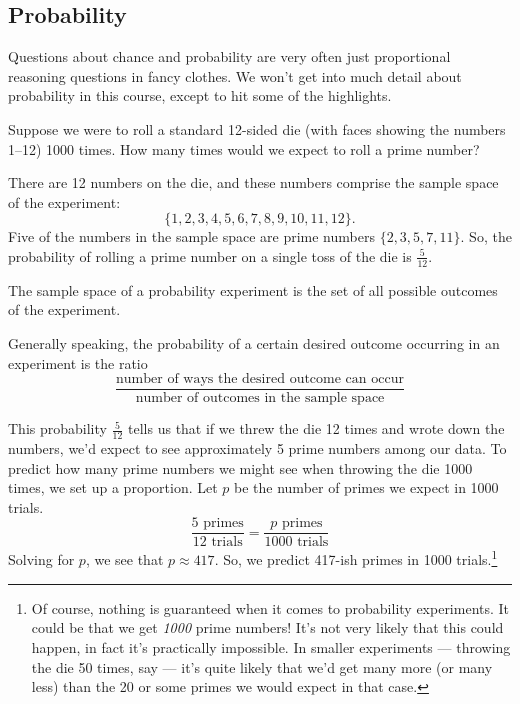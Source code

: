 \subsection{Probability}

Questions about chance and probability are very often just proportional reasoning questions in fancy clothes. We won't get into much detail about probability in this course, except to hit some of the highlights.

\begin{boxedexplore}
Suppose we were to roll a standard 12-sided die (with faces showing the numbers 1--12) 1000 times. How many times would we expect to roll a prime number?
\end{boxedexplore}

There are 12 numbers on the die, and these numbers comprise the \gls{sample space} of the experiment: \[\{1, 2, 3, 4, 5, 6, 7, 8, 9, 10, 11, 12\}.\] Five of the numbers in the sample space are prime numbers $\{2, 3, 5, 7, 11\}$. So, the probability of rolling a prime number on a single toss of the die is $\frac{5}{12}$.

\begin{boxeddef}
The sample space of a probability experiment is the set of all possible outcomes of the experiment.
\end{boxeddef}

Generally speaking, the probability of a certain desired outcome occurring in an experiment is the ratio \[\frac{\text{number of ways the desired outcome can occur}}{\text{number of outcomes in the sample space}}\]

This probability $\frac{5}{12}$ tells us that if we threw the die 12 times and wrote down the numbers, we'd expect to see approximately 5 prime numbers among our data. To predict how many prime numbers we might see when throwing the die 1000 times, we set up a proportion. Let $p$ be the number of primes we expect in 1000 trials. \[\frac{5\text{ primes}}{12\text{ trials}} = \frac{p\text{ primes}}{1000\text{ trials}}\] Solving for $p$, we see that $p\approx417$. So, we predict 417-ish primes in 1000 trials.\footnote{Of course, nothing is guaranteed when it comes to probability experiments. It could be that we get \textit{1000} prime numbers! It's not very likely that this could happen, in fact it's practically impossible. In smaller experiments --- throwing the die 50 times, say --- it's quite likely that we'd get many more (or many less) than the 20 or some primes we would expect in that case.}

